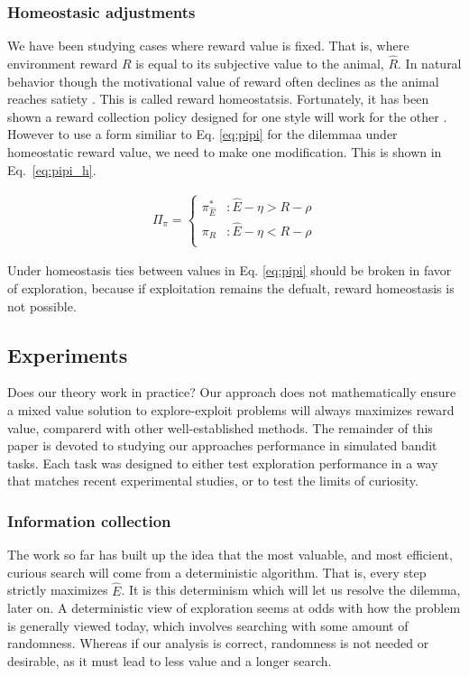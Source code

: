 \subsubsection*{Homeostasic adjustments}
We have been studying cases where reward value is fixed. That is, where environment reward $R$ is equal to its subjective value to the animal, $\hat R$. In natural behavior though the motivational value of reward often declines as the animal reaches satiety \citep{Keramati2014,Juechems2019,Munch2020}. This is called reward homeostatsis. Fortunately, it has been shown a reward collection policy designed for one style will work for the other \citep{Keramati2014}. However to use a form similiar to Eq. \ref{eq:pipi} for the dilemmaa under homeostatic reward value, we need to make one modification. This is shown in Eq.~\ref{eq:pipi_h}. 

\begin{equation} 
    \label{eq:pipi_h}
    \begin{split}
        \Pi_{\pi} = 
        \begin{cases}
            \pi^*_{\hat{E}} & : \hat{E} - \eta > R - \rho \\
            \pi_R 	& : \hat{E} - \eta < R - \rho \\
        \end{cases}
    \end{split}
\end{equation}

Under homeostasis ties between values in Eq. \ref{eq:pipi} should be broken in favor of exploration, because if exploitation remains the defualt, reward homeostasis is not possible. 

\subsection*{Experiments}
Does our theory work in practice? Our approach does not mathematically ensure a mixed value solution to explore-exploit problems will always maximizes reward value, comparerd with other well-established methods. The remainder of this paper is devoted to studying our approaches performance in simulated bandit tasks. Each task was designed to either test exploration performance in a way that matches recent experimental studies, or to test the limits of curiosity. 

\subsubsection*{Information collection}
The work so far has built up the idea that the most valuable, and most efficient, curious search will come from a deterministic algorithm. That is, every step strictly maximizes $\hat E$. It is this determinism which will let us resolve the dilemma, later on. A deterministic view of exploration seems at odds with how the problem is generally viewed today, which involves searching with some amount of randomness. Whereas if our analysis is correct, randomness is not needed or desirable, as it must lead to less value and a longer search. 

